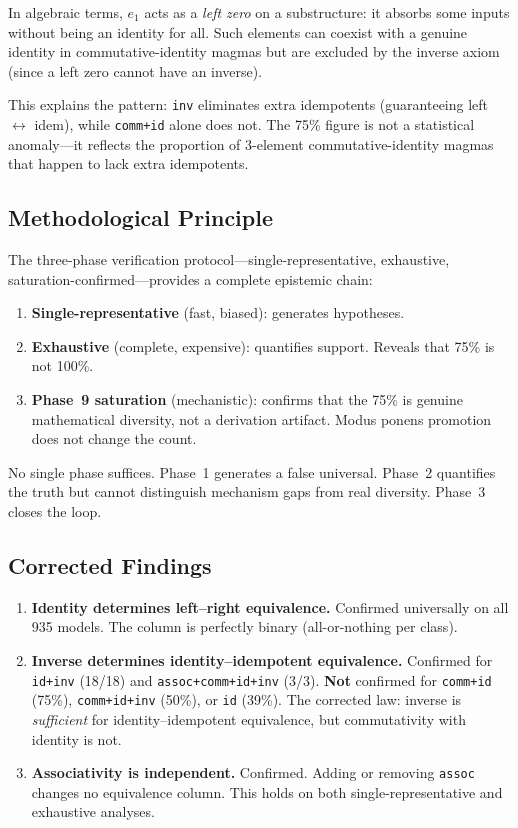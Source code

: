In algebraic terms, $e_1$ acts as a \emph{left zero} on a substructure: it absorbs some inputs without being an identity for all. Such elements can coexist with a genuine identity in commutative-identity magmas but are excluded by the inverse axiom (since a left zero cannot have an inverse).

This explains the pattern: \texttt{inv} eliminates extra idempotents (guaranteeing left $\leftrightarrow$ idem), while \texttt{comm+id} alone does not. The 75\% figure is not a statistical anomaly---it reflects the proportion of 3-element commutative-identity magmas that happen to lack extra idempotents.

\subsection{Methodological Principle}

The three-phase verification protocol---single-representative, exhaustive, saturation-confirmed---provides a complete epistemic chain:

\begin{enumerate}
\item \textbf{Single-representative} (fast, biased): generates hypotheses.
\item \textbf{Exhaustive} (complete, expensive): quantifies support. Reveals that 75\% is not 100\%.
\item \textbf{Phase~9 saturation} (mechanistic): confirms that the 75\% is genuine mathematical diversity, not a derivation artifact. Modus ponens promotion does not change the count.
\end{enumerate}

\noindent No single phase suffices. Phase~1 generates a false universal. Phase~2 quantifies the truth but cannot distinguish mechanism gaps from real diversity. Phase~3 closes the loop.

\subsection{Corrected Findings}

\begin{enumerate}
\item \textbf{Identity determines left--right equivalence.} Confirmed universally on all 935 models. The column is perfectly binary (all-or-nothing per class).

\item \textbf{Inverse determines identity--idempotent equivalence.} Confirmed for \texttt{id+inv} (18/18) and \texttt{assoc+comm+id+inv} (3/3). \textbf{Not} confirmed for \texttt{comm+id} (75\%), \texttt{comm+id+inv} (50\%), or \texttt{id} (39\%). The corrected law: inverse is \emph{sufficient} for identity--idempotent equivalence, but commutativity with identity is not.

\item \textbf{Associativity is independent.} Confirmed. Adding or removing \texttt{assoc} changes no equivalence column. This holds on both single-representative and exhaustive analyses.
\end{enumerate}
